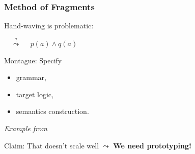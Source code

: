

\begin{frame}
    \frametitle{Method of Fragments}
    {\color{hlfont}Hand-waving} is problematic:

    \hspace{2em}
    {$\quad\stackrel{?}{\leadsto}\quad$ \color{logicfont} $p(a)\wedge q(a)$}

    \vspace{1.2em}
    {\color{hlfont}Montague}: Specify
    \begin{itemize}
        \item grammar,
        \item target logic,
        \item semantics construction.
    \end{itemize}

    {
        \centering
        \vspace{0.3em}
        {\itshape\footnotesize Example from~\cite{Montague:tptoqi73}}

        \vspace{0.2em}

        \vspace{1.2em}
        Claim: That doesn't scale well $\leadsto$ \textbf{We need {\color{hlfont}prototyping}!}
    }

\end{frame}

